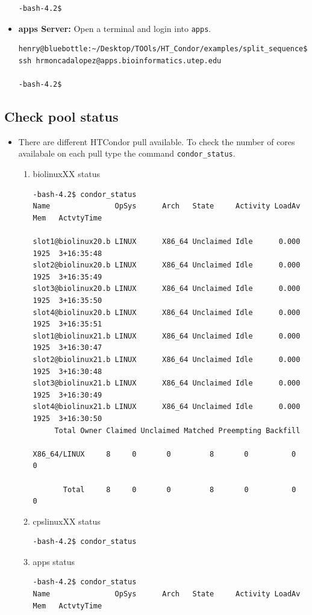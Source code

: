 \documentclass{article}
\begin{document}
\begin{itemize}
\begin{verbatim}
-bash-4.2$ 
\end{verbatim}
\normalsize
\item \textbf{apps Server:} Open a terminal and login into \verb+apps+.
\scriptsize\begin{verbatim}
henry@bluebottle:~/Desktop/TOOls/HT_Condor/examples/split_sequence$ ssh hrmoncadalopez@apps.bioinformatics.utep.edu

-bash-4.2$ 
\end{verbatim}
\normalsize
\end{itemize}

\subsection{Check pool status}
\begin{itemize}
\item There are different HTCondor pull available. To check the number of cores availabale on each pull type the command \verb+condor_status+. 
\begin{enumerate}
\item biolinuxXX status
\scriptsize\begin{verbatim}
-bash-4.2$ condor_status
Name               OpSys      Arch   State     Activity LoadAv Mem   ActvtyTime

slot1@biolinux20.b LINUX      X86_64 Unclaimed Idle      0.000 1925  3+16:35:48
slot2@biolinux20.b LINUX      X86_64 Unclaimed Idle      0.000 1925  3+16:35:49
slot3@biolinux20.b LINUX      X86_64 Unclaimed Idle      0.000 1925  3+16:35:50
slot4@biolinux20.b LINUX      X86_64 Unclaimed Idle      0.000 1925  3+16:35:51
slot1@biolinux21.b LINUX      X86_64 Unclaimed Idle      0.000 1925  3+16:30:47
slot2@biolinux21.b LINUX      X86_64 Unclaimed Idle      0.000 1925  3+16:30:48
slot3@biolinux21.b LINUX      X86_64 Unclaimed Idle      0.000 1925  3+16:30:49
slot4@biolinux21.b LINUX      X86_64 Unclaimed Idle      0.000 1925  3+16:30:50
     Total Owner Claimed Unclaimed Matched Preempting Backfill

X86_64/LINUX     8     0       0         8       0          0        0

       Total     8     0       0         8       0          0        0
\end{verbatim}
\normalsize
\item cpslinuxXX status
\tiny\begin{verbatim}
-bash-4.2$ condor_status
\end{verbatim}
\normalsize
\item apps status
\scriptsize\begin{verbatim}
-bash-4.2$ condor_status
Name               OpSys      Arch   State     Activity LoadAv Mem   ActvtyTime


\end{verbatim}
\end{enumerate}
\end{itemize}
\end{document}
